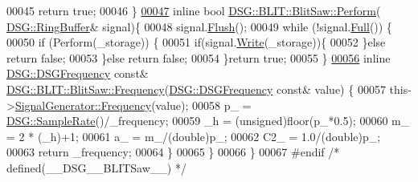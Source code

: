 \begin{DoxyCode}
00045             \textcolor{keywordflow}{return} \textcolor{keyword}{true};
00046         \}
\hypertarget{_b_l_i_t_saw_8h_source_l00047}{}\hyperlink{class_d_s_g_1_1_b_l_i_t_1_1_blit_saw_ad2edba8ed83558e76afed6ec1d5cf4d6}{00047}         \textcolor{keyword}{inline} \textcolor{keywordtype}{bool} \hyperlink{class_d_s_g_1_1_b_l_i_t_1_1_blit_saw_ae24821c51b23b9fe9220a620e558af04}{DSG::BLIT::BlitSaw::Perform}(
      \hyperlink{class_d_s_g_1_1_ring_buffer}{DSG::RingBuffer}& signal)\{
00048             signal.\hyperlink{class_d_s_g_1_1_ring_buffer_ab23c8003d2857809a816068eeb209d60}{Flush}();
00049             \textcolor{keywordflow}{while} (!signal.\hyperlink{class_d_s_g_1_1_ring_buffer_a53ddb04ffcbb5470a8d2b0a3c65b70cb}{Full}()) \{
00050                 \textcolor{keywordflow}{if} (Perform(\_storage)) \{
00051                     \textcolor{keywordflow}{if}(signal.\hyperlink{class_d_s_g_1_1_ring_buffer_aa5dd2caa0a270173251faee40a43d692}{Write}(\_storage))\{
00052                     \}\textcolor{keywordflow}{else} \textcolor{keywordflow}{return} \textcolor{keyword}{false};
00053                 \}\textcolor{keywordflow}{else} \textcolor{keywordflow}{return} \textcolor{keyword}{false};
00054             \}\textcolor{keywordflow}{return} \textcolor{keyword}{true};
00055         \}
\hypertarget{_b_l_i_t_saw_8h_source_l00056}{}\hyperlink{class_d_s_g_1_1_b_l_i_t_1_1_blit_saw_a290d01796efca84b73eb61a3bc419ebb}{00056}         \textcolor{keyword}{inline} \hyperlink{namespace_d_s_g_a4315a061386fa1014fda09b15d3a6973}{DSG::DSGFrequency} \textcolor{keyword}{const}& 
      \hyperlink{class_d_s_g_1_1_signal_generator_a4e6b3c43e76e53f8cd337ad699c464cb}{DSG::BLIT::BlitSaw::Frequency}(\hyperlink{namespace_d_s_g_a4315a061386fa1014fda09b15d3a6973}{DSG::DSGFrequency} \textcolor{keyword}{const}& value)
      \{
00057             this->\hyperlink{class_d_s_g_1_1_signal_generator_a4e6b3c43e76e53f8cd337ad699c464cb}{SignalGenerator::Frequency}(value);
00058             p\_ = \hyperlink{namespace_d_s_g_a72df05177db0412c3590070923f62819}{DSG::SampleRate}()/\_frequency;
00059             \_h = (unsigned)floor(p\_*0.5);
00060             m\_ = 2 * (\_h)+1;
00061             a\_ = m\_/(double)p\_;
00062             C2\_ = 1.0/(double)p\_;
00063             \textcolor{keywordflow}{return} \_frequency;
00064         \}
00065     \}
00066 \}
00067 \textcolor{preprocessor}{#endif }\textcolor{comment}{/* defined(\_\_DSG\_\_BLITSaw\_\_) */}\textcolor{preprocessor}{}
\end{DoxyCode}

